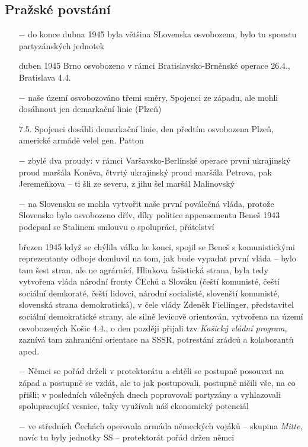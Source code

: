\documentclass{article}
\begin{document}
\subsection*{Pražské povstání}
\begin{itemize}
    \vspace{-0.5em}
    \setlength\itemsep{0.15em}
    \item[$-$] do konce dubna 1945 byla většina SLovenska osvobozena, bylo tu spoustu partyzánských jednotek
    \item[duben 1945] Brno osvobozeno v rámci Bratislavsko-Brněnské operace 26.4., Bratislava 4.4.
    \item[$-$] naše území osvobozováno třemi směry, Spojenci ze západu, ale mohli dosáhnout jen demarkační linie (Plzeň)
    \item[7.5.] Spojenci dosáhli demarkační linie, den předtím osvobozena Plzeň, americké armádě velel gen. Patton
    \item[$-$] zbylé dva proudy: v rámci Varšavsko-Berlínské operace první ukrajinský proud maršála Koněva, čtvrtý ukrajinský proud maršála Petrova, pak Jeremeňkova -- ti šli ze severu, z jihu šel maršál Malinovský
    \item[$-$] na Slovensku se mohla vytvořit naše první poválečná vláda, protože Slovensko bylo osvobozeno dřív, díky politice appeasementu Beneš 1943 podepsal se Stalinem smlouvu o spolupráci, přátelství
    \item[březen 1945] když se chýlila válka ke konci, spojil se Beneš s komunistickými reprezentanty odboje domluvil na tom, jak bude vypadat první vláda -- bylo tam šest stran, ale ne agrárnící, Hlinkova fašistická strana, byla tedy vytvořena vláda národní fronty ČEchů a Slováku (čeští komunisté, čeští sociální demkoraté, čeští lidovci, národní socialisté, slovenští komunisté, slovenská strana demokratická), v čele vlády Zdeněk Fiellinger, představitel sociální demokratické strany, ale silně levicově orientován, vytvořena na území osvobozených Košic 4.4., o den později přijali tzv \textit{Košický vládní program}, zaznívá tam zahraniční orientace na SSSR, potrestání zrádců a kolaborantů apod.
    \item[$-$] Němci se pořád drželi v protektorátu a chtěli se postupně posouvat na západ a postupně se vzdát, ale to jak postupovali, postupně ničili vše, na co přišli; v posledních válečných dnech popravovali partyzány a vyhlazovali spolupracující vesnice, taky využívali náš ekonomický potenciál
    \item[$-$] ve středních Čechách operovala armáda německých vojáků -- skupina \textit{Mitte}, navíc tu byly jednotky SS -- protektorát pořád držen němci

\end{itemize}
\end{document}
